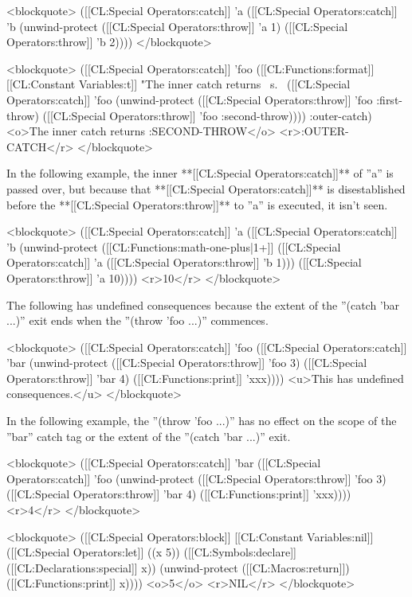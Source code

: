 <blockquote> 
([[CL:Special Operators:catch]] 'a 
  ([[CL:Special Operators:catch]] 'b 
    (unwind-protect 
      ([[CL:Special Operators:throw]] 'a 1) 
    ([[CL:Special Operators:throw]] 'b 2))))
</blockquote>

<blockquote> 
([[CL:Special Operators:catch]] 'foo
  ([[CL:Functions:format]] [[CL:Constant Variables:t]] "The inner catch returns ~s.~%
    ([[CL:Special Operators:catch]] 'foo 
      (unwind-protect 
          ([[CL:Special Operators:throw]] 'foo :first-throw) 
        ([[CL:Special Operators:throw]] 'foo :second-throw))))
  :outer-catch)
<o>The inner catch returns :SECOND-THROW</o>
<r>:OUTER-CATCH</r>
</blockquote>

In the following example, the inner **[[CL:Special Operators:catch]]** of ''a'' is passed over, but because that **[[CL:Special Operators:catch]]** is disestablished before the **[[CL:Special Operators:throw]]** to ''a'' is executed, it isn't seen. 

<blockquote>  
([[CL:Special Operators:catch]] 'a 
  ([[CL:Special Operators:catch]] 'b 
    (unwind-protect 
        ([[CL:Functions:math-one-plus|1+]] ([[CL:Special Operators:catch]] 'a ([[CL:Special Operators:throw]] 'b 1))) 
      ([[CL:Special Operators:throw]] 'a 10)))) <r>10</r>
</blockquote>

The following has undefined consequences because the extent of the ''(catch 'bar ...)'' exit ends when the ''(throw 'foo ...)'' commences. 

<blockquote> 
([[CL:Special Operators:catch]] 'foo 
  ([[CL:Special Operators:catch]] 'bar 
    (unwind-protect 
        ([[CL:Special Operators:throw]] 'foo 3) 
      ([[CL:Special Operators:throw]] 'bar 4) 
      ([[CL:Functions:print]] 'xxx))))
<u>This has undefined consequences.</u>
</blockquote>

In the following example, the ''(throw 'foo ...)'' has no effect on the scope of the ''bar'' catch tag or the extent of the ''(catch 'bar ...)'' exit. 

<blockquote> 
([[CL:Special Operators:catch]] 'bar 
  ([[CL:Special Operators:catch]] 'foo 
    (unwind-protect 
        ([[CL:Special Operators:throw]] 'foo 3) 
      ([[CL:Special Operators:throw]] 'bar 4) 
      ([[CL:Functions:print]] 'xxx))))
<r>4</r>
</blockquote>

<blockquote>
([[CL:Special Operators:block]] [[CL:Constant Variables:nil]] 
  ([[CL:Special Operators:let]] ((x 5))
    ([[CL:Symbols:declare]] ([[CL:Declarations:special]] x))
    (unwind-protect 
        ([[CL:Macros:return]]) 
      ([[CL:Functions:print]] x))))
<o>5</o>
<r>NIL</r>
</blockquote>

